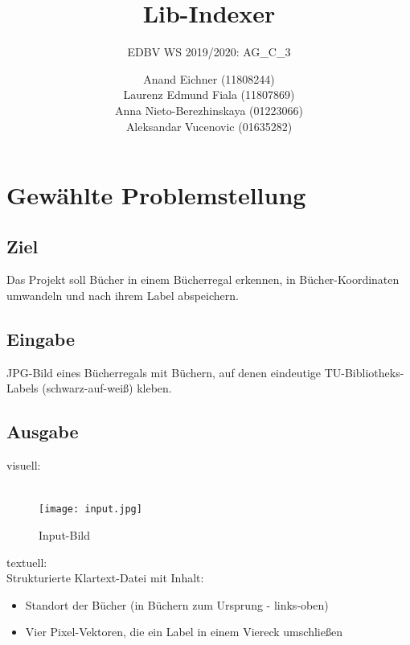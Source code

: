 \documentclass[paper=A4, deutsch]{scrartcl}
\begin{document}

\title{Lib-Indexer} %

\subtitle{EDBV WS 2019/2020: AG\_C\_3} %


\author{Anand Eichner (11808244)\\
Laurenz Edmund Fiala (11807869)\\
Anna Nieto-Berezhinskaya (01223066)\\
Aleksandar Vucenovic (01635282)}




\maketitle


\section{Gewählte Problemstellung}
\subsection{Ziel}
Das Projekt soll Bücher in einem Bücherregal erkennen, in Bücher-Koordinaten umwandeln und nach ihrem Label abspeichern.

\subsection{Eingabe}
JPG-Bild eines Bücherregals mit Büchern, auf denen eindeutige TU-Bibliotheks-Labels (schwarz-auf-weiß) kleben.

\subsection{Ausgabe}
visuell:\\
\\
\begin{figure}[H]
 \centering
 \texttt{[image: input.jpg]}
 \caption{Input-Bild}
 \label{fig:img}
\end{figure}


\noindent textuell:\\
Strukturierte Klartext-Datei mit Inhalt:
\begin{itemize}
  \item Standort der Bücher (in Büchern zum Ursprung - links-oben)
  \item Vier Pixel-Vektoren, die ein Label in einem Viereck umschließen
\end{itemize}
\end{document}
